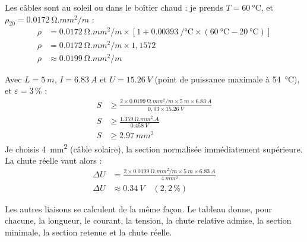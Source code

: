\begin{demonstration}
Les câbles sont au soleil ou dans le boîtier chaud : je prends $T = \qty{60}{\celsius}$, et $\rho_{20} = \qty{0,0172}{\ohm.mm^2/m}$ :
\begin{align*}
\rho &= \qty{0,0172}{\ohm.mm^2/m} \times \left[1 + \qty{0,00393}{/\celsius} \times (\qty{60}{\celsius} - \qty{20}{\celsius})\right]\\
\rho &= \qty{0,0172}{\ohm.mm^2/m} \times 1{,}1572\\
\rho &\approx \qty{0,0199}{\ohm.mm^2/m}
\end{align*}
\end{demonstration}

\begin{demonstration}
Avec $L = \qty{5}{m}$, $I = \qty{6,83}{A}$ et $U = \qty{15,26}{V}$ (point de puissance maximale à \qty{54}{\celsius}), et $\varepsilon = 3\,\%$ :
\begin{align*}
S &\geq \frac{2 \times \qty{0,0199}{\ohm.mm^2/m} \times \qty{5}{m} \times \qty{6,83}{A}}{0{,}03 \times \qty{15,26}{V}}\\
S &\geq \frac{\qty{1,359}{\ohm.mm^2.A}}{\qty{0,458}{V}}\\
S &\geq \qty{2,97}{mm^2}
\end{align*}
Je choisis \qty{4}{mm^2} (câble solaire), la section normalisée immédiatement supérieure. La chute réelle vaut alors :
\begin{align*}
\Delta U &= \frac{2 \times \qty{0,0199}{\ohm.mm^2/m} \times \qty{5}{m} \times \qty{6,83}{A}}{\qty{4}{mm^2}}\\
\Delta U &\approx \qty{0,34}{V} \quad (2{,}2\,\%)
\end{align*}
\end{demonstration}

Les autres liaisons se calculent de la même façon. Le tableau donne, pour chacune, la longueur, le courant, la tension, la chute relative admise, la section minimale, la section retenue et la chute réelle.

